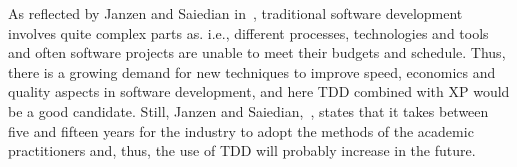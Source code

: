 As reflected by Janzen and Saiedian in~\cite{janzen2}, traditional software development involves quite complex parts as. i.e., different processes, technologies and tools and often software projects are unable to meet their budgets and schedule. Thus, there is a growing demand for new techniques to improve speed, economics and quality aspects in software development, and here TDD combined with XP would be a good candidate. Still, Janzen and Saiedian,~\cite{janzen2}, states that it takes between five and fifteen years for the industry to adopt the methods of the academic practitioners and, thus, the use of TDD will probably increase in the future. 